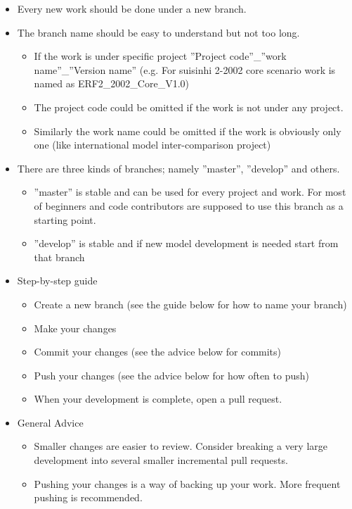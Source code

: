\documentclass[10pt,a4paper,titlepage,dvipdfmx]{book}
\begin{document}
\begin{itemize}
\item Every new work should be done under a new branch.
\item The branch name should be easy to understand but not too long.
\begin{itemize}
\item If the work is under specific project ''Project code''\_''work name''\_''Version name'' (e.g. For suisinhi 2-2002 core scenario work is named as ERF2\_2002\_Core\_V1.0)
\item The project code could be omitted if the work is not under any project. 
\item Similarly the work name could be omitted if the work is obviously only one (like international model inter-comparison project)
\end{itemize}

\item There are three kinds of branches; namely ''master'', ''develop'' and others. 
\begin{itemize}
\item ''master'' is stable and can be used for every project and work. For most of beginners and code contributors are supposed to use this branch as a starting point.
\item ''develop'' is stable and if new model development is needed start from that branch
\end{itemize}

\item Step-by-step guide
\begin{itemize}
\item Create a new branch (see the guide below for how to name your branch)
\item Make your changes
\item Commit your changes (see the advice below for commits)
\item Push your changes (see the advice below for how often to push)
\item When your development is complete, open a pull request.
\end{itemize}

\item General Advice
\begin{itemize}
\item Smaller changes are easier to review. Consider breaking a very large development into several smaller incremental pull requests.
\item Pushing your changes is a way of backing up your work. More frequent pushing is recommended.
\end{itemize}

\end{itemize}
\end{document}
